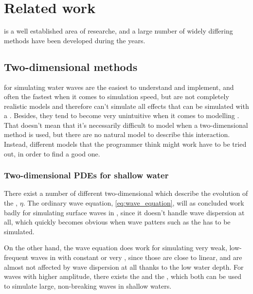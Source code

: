 \chapter{Related work}


\CFD is a well established area of researche, and a large number of widely differing methods have been developed during the years. 

\section{Two-dimensional methods}

 for simulating water waves are the easiest to understand and implement, and often the fastest when it comes to simulation speed, but are not completely realistic models and therefore can't simulate all effects that can be simulated with a . Besides, they tend to become very unintuitive when it comes to modelling \FSI. That doesn't mean that it's necessarily difficult to model \FSI when a two-dimensional method is used, but there are no natural model to describe this interaction. Instead, different models that the programmer think might work have to be tried out, in order to find a good  one.

\subsection{Two-dimensional PDEs for shallow water}

There exist a number of different two-dimensional \PDEs which describe the evolution of the , $\eta$. The ordinary wave equation, \eqref{eq:wave_equation}, will as concluded work badly for simulating surface waves in , since it doesn't handle wave dispersion at all, which quickly becomes obvious when wave patters such as the  has to be simulated.

On the other hand, the wave equation does work for simulating very weak, low-frequent waves in  with constant or very , since those are close to linear, and are almost not affected by wave dispersion at all thanks to the low water depth. For waves with higher amplitude, there exists the  and the , which both can be used to simulate large, non-breaking waves in shallow waters.

